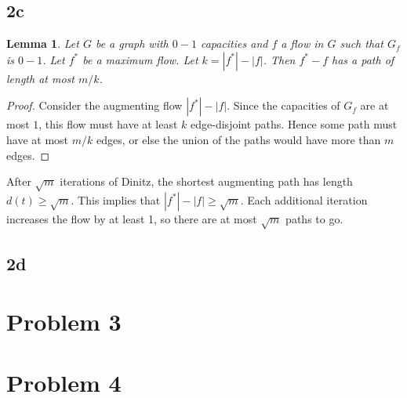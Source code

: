 \documentclass{article}
\newtheorem{lemma}{Lemma}
\begin{document}
\subsection*{2c}
\begin{lemma} Let $G$ be a graph with $0-1$ capacities and $f$ a flow in $G$
such that $G_f$ is $0-1$. Let $f^*$ be a maximum flow. Let $k=|f^*| - |f|$.
Then $f^*-f$ has a path of length at most
$m/k$. \end{lemma}
\begin{proof}
Consider the augmenting flow $|f^*| - |f|$. Since the capacities of $G_f$ are
at most $1$, this flow must have at least $k$ edge-disjoint paths.  Hence some
path must have at most $m/k$ edges, or else the union of the paths would have
more than $m$ edges.
\end{proof}
After $\sqrt{m}$ iterations of Dinitz, the shortest augmenting path has length
$d(t) \geq \sqrt{m}$. This implies that $|f^*| - |f| \geq \sqrt{m}$. Each
additional iteration increases the flow by at least 1, so there are at most
$\sqrt{m}$ paths to go.

\subsection*{2d}

\section*{Problem 3}

\section*{Problem 4}
\end{document}
